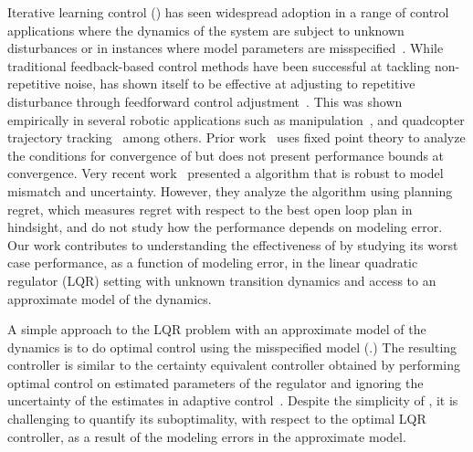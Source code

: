 Iterative learning control (\ILC{}) has seen widespread adoption in a range of control
applications where the dynamics of the system are subject to unknown
disturbances or in instances where model parameters are
misspecified~\cite{DBLP:journals/jfr/MooreDB92}. While traditional feedback-based control methods
have been successful at tackling non-repetitive noise, \ILC{} has shown itself to
be effective at adjusting to repetitive disturbance through feedforward control
adjustment~\cite{arimoto84}. This was shown empirically in several robotic
applications such as manipulation~\cite{kuc91}, and quadcopter trajectory
tracking~\cite{schoellig12a, schoellig12b} among others.
Prior work~\cite{an1988model} uses fixed point theory to analyze the
conditions for convergence of \ILC{} but does not present performance
bounds at convergence. Very recent
work~\cite{DBLP:conf/icml/AgarwalHMS21} presented a \ILC{} algorithm
that is robust to model mismatch and uncertainty. However, they
analyze the algorithm using planning regret, which measures regret
with respect to the best open loop plan in hindsight, and do not
study how the performance depends on modeling error.
Our work contributes to understanding the effectiveness of \ILC{}
by studying its worst case performance, as a function of modeling
error, in the linear quadratic
regulator (LQR) setting with unknown transition dynamics
and access to
an approximate model of the dynamics.

A simple approach to the LQR problem with an approximate
model of the dynamics is
to do optimal control using the misspecified model (\MM{}.) The
resulting controller is similar to the certainty equivalent controller
obtained by performing optimal control on estimated parameters of the
regulator and ignoring the uncertainty of the estimates in adaptive
control~\cite{astrom13}.
Despite the
simplicity of \MM{}, it is challenging to quantify its suboptimality, with
respect to the optimal LQR controller, as a result of the
modeling errors in the approximate model.

